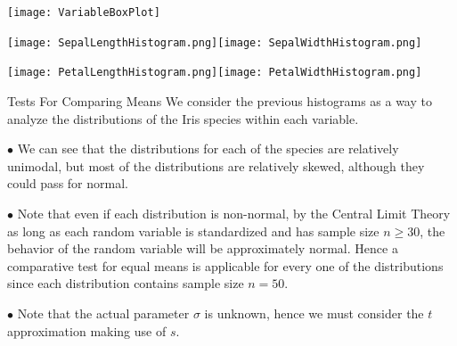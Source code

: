 \begin{frame}
\centerline{\texttt{[image: VariableBoxPlot]}}
\end{frame}

\begin{frame}
\centerline{\texttt{[image: SepalLengthHistogram.png]}\texttt{[image: SepalWidthHistogram.png]}}
\centerline{\texttt{[image: PetalLengthHistogram.png]}\texttt{[image: PetalWidthHistogram.png]}}
\end{frame}

\begin{frame}{Tests For Comparing Means}
We consider the previous histograms as a way to analyze the distributions of the Iris species  within each variable. 

\vspace{2mm}
$\bullet$ We can see that the distributions for each of the species are relatively unimodal, but most of the distributions are relatively skewed, although they could pass for normal.

\vspace{2mm}
$\bullet$ Note that even if each distribution is non-normal, by the Central Limit Theory as long as each random variable is standardized and has sample size $n\geq 30$, the behavior of the random variable will be approximately normal. Hence a comparative test for equal means is applicable for every one of the distributions since each distribution contains sample size $n=50$.

\vspace{2mm}
$\bullet$ Note that the actual parameter $\sigma$ is unknown, hence we must consider the $t$ approximation making use of $s$.
\end{frame}

